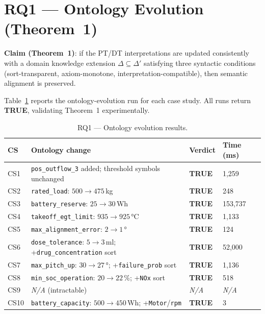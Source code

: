 \documentclass[10pt,a4paper]{article}
\newcommand{\OK}{\textcolor{okgreen}{\textbf{TRUE}}}
\newcommand{\NA}{\textcolor{notegray}{\textit{N/A}}}
\begin{document}
\section{RQ1 — Ontology Evolution (Theorem~1)}

\textbf{Claim (Theorem~1)}: if the PT/DT interpretations are updated
consistently with a domain knowledge extension $\Delta \subseteq \Delta'$
satisfying three syntactic conditions (sort-transparent, axiom-monotone,
interpretation-compatible), then semantic alignment is preserved.

Table~\ref{tab:rq1} reports the ontology-evolution run for each case study.
All runs return \OK{}, validating Theorem~1 experimentally.

\begin{table}[htbp]
\centering
\caption{RQ1 — Ontology evolution results.}
\label{tab:rq1}
\small
\begin{tabular}{@{}llll@{}}
\toprule
\textbf{CS} & \textbf{Ontology change} & \textbf{Verdict} & \textbf{Time (ms)} \\
\midrule
CS1  & \texttt{pos\_outflow\_3} added; threshold symbols unchanged           & \OK & 1{,}259 \\
CS2  & \texttt{rated\_load}: $500 \to 475$\,kg                               & \OK & 248 \\
CS3  & \texttt{battery\_reserve}: $25 \to 30$\,Wh                           & \OK & 153{,}737 \\
CS4  & \texttt{takeoff\_egt\_limit}: $935 \to 925$\,°C                       & \OK & 1{,}133 \\
CS5  & \texttt{max\_alignment\_error}: $2 \to 1$\,°                          & \OK & 124 \\
CS6  & \texttt{dose\_tolerance}: $5 \to 3$\,ml; +\texttt{drug\_concentration} sort & \OK & 52{,}000 \\
CS7  & \texttt{max\_pitch\_up}: $30 \to 27$\,°; +\texttt{failure\_prob} sort & \OK & 1{,}136 \\
CS8  & \texttt{min\_soc\_operation}: $20 \to 22$\,\%; +\texttt{NOx} sort      & \OK & 518 \\
CS9  & \NA{} (intractable)                                                    & \NA & \NA \\
CS10 & \texttt{battery\_capacity}: $500 \to 450$\,Wh; +\texttt{Motor}/\texttt{rpm} & \OK & 3 \\
\bottomrule
\end{tabular}
\end{table}
\end{document}
